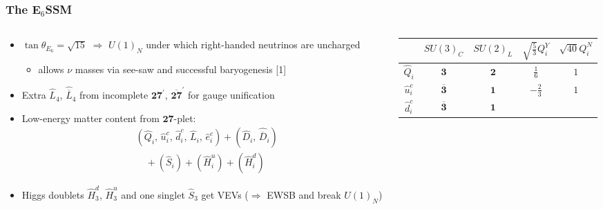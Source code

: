\documentclass[10pt,aspectratio=169]{beamer}
\begin{document}
\begin{frame}
  \frametitle{The E$_6$SSM}
    \begin{columns}[t]
      \begin{column}{0.5\textwidth}
        \vspace*{-15pt}
        \begin{itemize} \itemsep0.5em
        \item $\tan\theta_{E_6} = \sqrt{15}$ $\Rightarrow$ $U(1)_N$
          under which right-handed neutrinos are uncharged
          \begin{itemize}
          \item allows $\nu$ masses via see-saw and
            successful baryogenesis [1]
          \end{itemize}
        \item Extra $\hat{L}_4$, $\hat{\overline{L}}_4$ from incomplete
          $\mathbf{27}^\prime$, $\mathbf{\overline{27}}^\prime$ for gauge
          unification
        \item Low-energy matter content from $\mathbf{27}$-plet:
          \begin{align*}
            &(\hat{Q}_i, \, \hat{u}^c_i, \, \hat{d}^c_i, \, \hat{L}_i, \,
            \hat{e}^c_i) + (\hat{D}_i, \, \hat{\overline{D}}_i)\\
            &\quad {} + (\hat{S}_{i}) + (\hat{H}^u_i) + (\hat{H}^d_i)
          \end{align*}
        \item Higgs doublets $\hat{H}^d_3$, $\hat{H}^u_3$ and one singlet
          $\hat{S}_3$ get VEVs ($\Rightarrow$ EWSB and break $U(1)_N$)
        \end{itemize}
      \end{column}
      \begin{column}{0.5\textwidth}
        \vspace{-25pt}
        \begin{table}[h]
          \centering
          \begin{tabular}{ccccc}
            \toprule
            & $SU(3)_C$ & $SU(2)_L$ & $\sqrt{\frac{5}{3}} Q_i^Y$
            & $\sqrt{40} Q_i^N$ \\
            \midrule
            $\hat{Q}_i$ & $\mathbf{3}$ & $\mathbf{2}$ & $\frac{1}{6}$ & $1$ \\
            $\hat{u}_i^c$ & $\mathbf{\overline{3}}$ & $\mathbf{1}$
            & $-\frac{2}{3}$ & $1$ \\
            $\hat{d}_i^c$ & $\mathbf{\overline{3}}$ & $\mathbf{1}$

\end{tabular}
\end{table}
\end{column}
\end{columns}
\end{frame}
\end{document}
